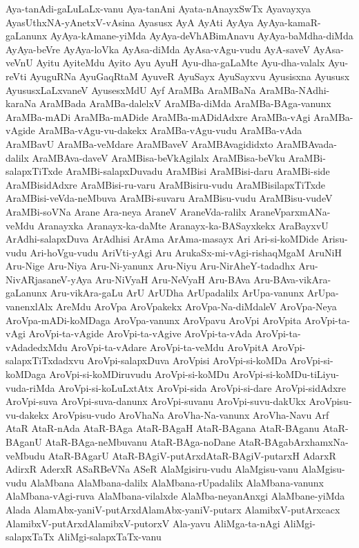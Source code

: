 {Aya-tanAdi-gaLuLaLx-vanu
Aya-tanAni
Ayata-nAnayxSwTx
Ayavayxya
AyasUthxNA-yAnetxV-vAsina
Ayasusx
AyA
AyAti
AyAya
AyAya-kamaR-gaLanunx
AyAya-kAmane-yiMda
AyAya-deVhABimAnavu
AyAya-baMdha-diMda
AyAya-beVre
AyAya-loVka
AyAsa-diMda
AyAsa-vAgu-vudu
AyA-saveV
AyAsa-veVnU
Ayitu
AyiteMdu
Ayito
Ayu
AyuH
Ayu-dha-gaLaMte
Ayu-dha-valalx
Ayu-reVti
AyuguRNa
AyuGaqRtaM
AyuveR
AyuSayx
AyuSayxvu
Ayusisxna
Ayususx
AyususxLaLxvaneV
AyusesxMdU
Ayf
AraMBa
AraMBaNa
AraMBa-NAdhi-karaNa
AraMBada
AraMBa-dalelxV
AraMBa-diMda
AraMBa-BAga-vanunx
AraMBa-mADi
AraMBa-mADide
AraMBa-mADidAdxre
AraMBa-vAgi
AraMBa-vAgide
AraMBa-vAgu-vu-dakekx
AraMBa-vAgu-vudu
AraMBa-vAda
AraMBavU
AraMBa-veMdare
AraMBaveV
AraMBAvagididxto
AraMBAvada-dalilx
AraMBAva-daveV
AraMBisa-beVkAgilalx
AraMBisa-beVku
AraMBi-salapxTiTxde
AraMBi-salapxDuvadu
AraMBisi
AraMBisi-daru
AraMBi-side
AraMBisidAdxre
AraMBisi-ru-varu
AraMBisiru-vudu
AraMBisilapxTiTxde
AraMBisi-veVda-neMbuva
AraMBi-suvaru
AraMBisu-vudu
AraMBisu-vudeV
AraMBi-soVNa
Arane
Ara-neya
AraneV
AraneVda-ralilx
AraneVparxmANa-veMdu
Aranayxka
Aranayx-ka-daMte
Aranayx-ka-BASayxkekx
AraBayxvU
ArAdhi-salapxDuva
ArAdhisi
ArAma
ArAma-masayx
Ari
Ari-si-koMDide
Arisu-vudu
Ari-hoVgu-vudu
AriVti-yAgi
Aru
ArukaSx-mi-vAgi-rishaqMgaM
AruNiH
Aru-Nige
Aru-Niya
Aru-Ni-yanunx
Aru-Niyu
Aru-NirAheY-tadadhx
Aru-NivARjasaneV-yAya
Aru-NiVyaH
Aru-NeVyaH
Aru-BAva
Aru-BAva-vikAra-gaLanunx
Aru-vikAra-gaLu
ArU
ArUDha
ArUpadalilx
ArUpa-vanunx
ArUpa-vanenxlAlx
AreMdu
AroVpa
AroVpakekx
AroVpa-Na-diMdaleV
AroVpa-Neya
AroVpa-mADi-koMDaga
AroVpa-vanunx
AroVpavu
AroVpi
AroVpita
AroVpi-ta-vAgi
AroVpi-ta-vAgide
AroVpi-ta-vAgive
AroVpi-ta-vAda
AroVpi-ta-vAdadedxMdu
AroVpi-ta-vAdare
AroVpi-ta-veMdu
AroVpitA
AroVpi-salapxTiTxdadxvu
AroVpi-salapxDuva
AroVpisi
AroVpi-si-koMDa
AroVpi-si-koMDaga
AroVpi-si-koMDiruvudu
AroVpi-si-koMDu
AroVpi-si-koMDu-tiLiyu-vuda-riMda
AroVpi-si-koLuLxtAtx
AroVpi-sida
AroVpi-si-dare
AroVpi-sidAdxre
AroVpi-suva
AroVpi-suva-danunx
AroVpi-suvanu
AroVpi-suvu-dakUkx
AroVpisu-vu-dakekx
AroVpisu-vudo
AroVhaNa
AroVha-Na-vanunx
AroVha-Navu
Arf
AtaR
AtaR-nAda
AtaR-BAga
AtaR-BAgaH
AtaR-BAgana
AtaR-BAganu
AtaR-BAganU
AtaR-BAga-neMbuvanu
AtaR-BAga-noDane
AtaR-BAgabArxhamxNa-veMbudu
AtaR-BAgarU
AtaR-BAgiV-putArxdAtaR-BAgiV-putarxH
AdarxR
AdirxR
AderxR
ASaRBeVNa
ASeR
AlaMgisiru-vudu
AlaMgisu-vanu
AlaMgisu-vudu
AlaMbana
AlaMbana-dalilx
AlaMbana-rUpadalilx
AlaMbana-vanunx
AlaMbana-vAgi-ruva
AlaMbana-vilalxde
AlaMba-neyanAnxgi
AlaMbane-yiMda
Alada
AlamAbx-yaniV-putArxdAlamAbx-yaniV-putarx
AlamibxV-putArxcacx
AlamibxV-putArxdAlamibxV-putorxV
Ala-yavu
AliMga-ta-nAgi
AliMgi-salapxTaTx
AliMgi-salapxTaTx-vanu
}

